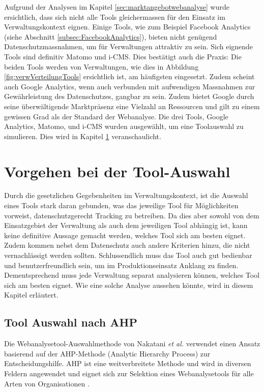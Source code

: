 Aufgrund der Analysen im Kapitel \ref{sec:marktangebotwebanalyse} wurde ersichtlich, dass sich nicht alle Tools gleichermassen für den Einsatz im Verwaltungskontext eignen. Einige Tools, wie zum Beispiel Facebook Analytics (siehe Abschnitt \ref{subsec:FacebookAnalytics}), bieten nicht genügend Datenschutzmassnahmen, um für Verwaltungen attraktiv zu sein. Sich eignende Tools sind definitiv Matomo und i-CMS. Dies bestätigt auch die Praxis: Die beiden Tools werden von Verwaltungen, wie dies in Abbildung \ref{fig:verwVerteilungTools} ersichtlich ist, am häufigsten eingesetzt. Zudem scheint auch Google Analytics, wenn auch verbunden mit aufwendigen Massnahmen zur Gewährleistung des Datenschutzes, gangbar zu sein. Zudem bietet Google durch seine überwältigende Marktpräsenz eine Vielzahl an Ressourcen und gilt zu einem gewissen Grad als der Standard der Webanalyse. Die drei Tools, Google Analytics, Matomo, und i-CMS wurden ausgewählt, um eine Toolauswahl zu simulieren. Dies wird in Kapitel \ref{sec:toolsel} veranschaulicht.

\section{Vorgehen bei der Tool-Auswahl} \label{sec:toolsel}

Durch die gesetzlichen Gegebenheiten im Verwaltungskontext, ist die Auswahl eines Tools stark daran gebunden, was das jeweilige Tool für Möglichkeiten vorweist, datenschutzgerecht Tracking zu betreiben. Da dies aber sowohl von dem Einsatzgebiet der Verwaltung als auch dem jeweiligen Tool abhängig ist, kann keine definitive Aussage gemacht werden, welches Tool sich am besten eignet. Zudem kommen nebst dem Datenschutz auch andere Kriterien hinzu, die nicht vernachlässigt werden sollten. Schlussendlich muss das Tool auch gut bedienbar und benutzerfreundlich sein, um im Produktionseinsatz Anklang zu finden. Dementsprechend muss jede Verwaltung separat analysieren können, welches Tool sich am besten eignet. Wie eine solche Analyse aussehen könnte, wird in diesem Kapitel erläutert. 

\subsection{Tool Auswahl nach AHP} \label{subsec:toolauswAHP}

Die Webanalysetool-Auswahlmethode von Nakatani \textit{et al.} \parencite{nakatani2011toolselectionmethod} verwendet einen Ansatz basierend auf der AHP-Methode (Analytic Hierarchy Process) zur Entscheidungshilfe. AHP ist eine weitverbreitete Methode und wird in diversen Feldern angewendet und eignet sich zur Selektion eines Webanalysetools für alle Arten von Organisationen \parencite[S. 176]{nakatani2011toolselectionmethod}. 

